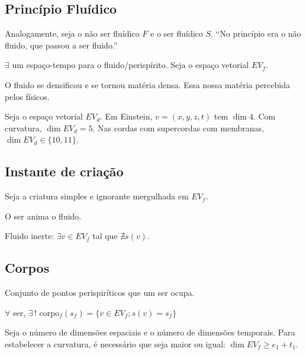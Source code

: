 \documentclass[12pt,a4paper]{article}
\begin{document}
			\subsection{Princ\'ipio Flu\'idico}

			\begin{flushright}
			\end{flushright}

			Analogamente, seja o n\~ao ser flu\'idico $F$ e o ser flu\'idico $S$. \textquotedblleft No princ\'ipio era o n\~ao fluido, que passou a ser fluido.\textquotedblright

			$\exists$ um espa\c{c}o-tempo para o fluido/perisp\'irito. Seja o espa\c{c}o vetorial $EV_f$.

			O fluido se densificou e se tornou mat\'eria densa. Essa nossa mat\'eria percebida pelos f\'isicos.

			Seja o espa\c{c}o vetorial $EV_d$. Em Einstein, $v = (x,y,z,t)$ tem $\dim 4$. Com curvatura, $\dim EV_d = 5$. Nas cordas com supercordas com membranas, $\dim EV_d \in \{10, 11\}$.

			\subsection{Instante de cria\c{c}\~ao}

			\begin{flushright}
			\end{flushright}

			Seja a criatura simples e ignorante mergulhada em $EV_f$.

			O ser anima o fluido.

			Fluido inerte: $\exists v \in EV_f$ tal que $\nexists s(v)$.

			\subsection{Corpos}\label{corpos} %

			\begin{flushright}
			\end{flushright}

			Conjunto de pontos perispir\'iticos que um ser ocupa.

			$\forall$ ser, $\exists\,!$ corpo$_f(s_f) = \{v \in EV_f ; s(v) = s_f \}$

			Seja o n\'umero de dimens\~oes espaciais e o n\'umero de dimens\~oes temporais. Para estabelecer a curvatura, \'e necess\'ario que seja maior ou igual: $\dim EV_f \ge e_1 + t_1$.
\end{document}
